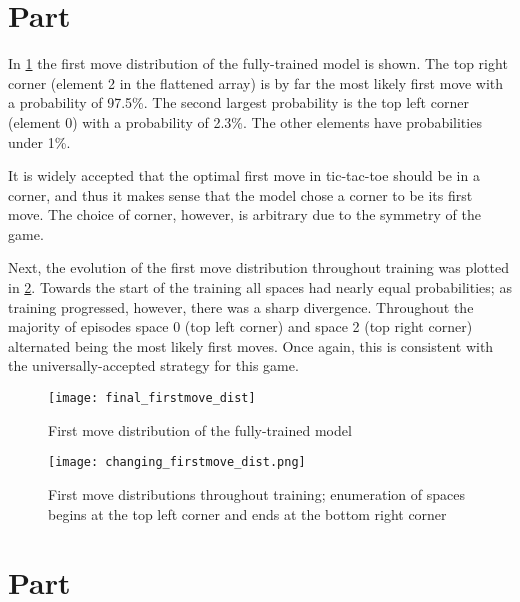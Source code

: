 \documentclass{article}
\newcommand{\enterproblemHeader}[1]{
}
\newcommand{\exitproblemHeader}[1]{
}
\newcounter{problem} %
\newcommand{\problemName}{}
\newenvironment{problem}[1][Part \theproblem]{ %
	\stepcounter{problem} %
	\renewcommand{\problemName}{#1} %
	\section{\problemName} %
	\enterproblemHeader{\problemName} %
}{
	\exitproblemHeader{\problemName} %
}
\begin{document}
\FloatBarrier
\begin{problem}
 In \cref{fig:final_firstmove_dist} the first move distribution of the fully-trained model is shown. The top right corner (element 2 in the flattened array) is by far the most likely first move with a probability of 97.5\%. The second largest probability is the top left corner (element 0) with a probability of 2.3\%. The other elements have probabilities under 1\%.
 
 It is widely accepted that the optimal first move in tic-tac-toe should be in a corner, and thus it makes sense that the model chose a corner to be its first move. The choice of corner, however, is arbitrary due to the symmetry of the game.
 
 Next, the evolution of the first move distribution throughout training was plotted in \cref{fig:changing_firstmove_dist}. Towards the start of the training all spaces had nearly equal probabilities; as training progressed, however, there was a sharp divergence. Throughout the majority of episodes space 0 (top left corner) and space 2 (top right corner) alternated being the most likely first moves. Once again, this is consistent with the universally-accepted strategy for this game.

    \begin{figure}
    \begin{center}
    \texttt{[image: final\_firstmove\_dist]}
    \caption{First move distribution of the fully-trained model}
    \label{fig:final_firstmove_dist}
    \end{center}
    \end{figure}
    
    \begin{figure}
    \texttt{[image: changing\_firstmove\_dist.png]}
    \caption{First move distributions throughout training; enumeration of spaces begins at the top left corner and ends at the bottom right corner}
    \label{fig:changing_firstmove_dist}
    \end{figure}
	
\end{problem}
\clearpage

\FloatBarrier
\begin{problem}
	
	
\end{problem}
\clearpage


\end{document}
